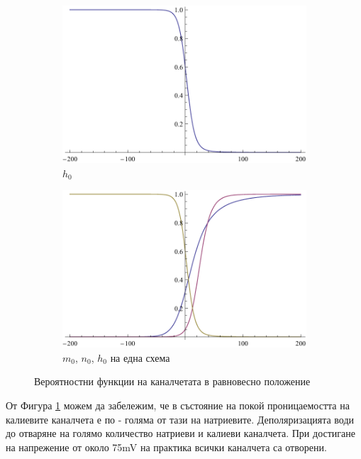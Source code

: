 \documentclass{article}
\numberwithin{equation}{section}
\begin{document}
\begin{figure}[H]
\begin{subfigure}[t]{0.3\textwidth}
            \includegraphics[width=\textwidth]{./schemas/h0.pdf}
            \caption{$h_0$}
        \end{subfigure}
        \begin{subfigure}[t]{0.3\textwidth}
            \includegraphics[width=\textwidth]{./schemas/chanels_combined.pdf}
            \caption{$m_0$, $n_0$, $h_0$ на една схема}
        \end{subfigure}
        \caption{Вероятностни функции на каналчетата в равновесно положение}\label{fig:chanel_prob}
    \end{figure}
    
    От Фигура \ref{fig:chanel_prob} можем да забележим, че в състояние на покой проницаемостта на калиевите каналчета е по - голяма от тази
    на натриевите. Деполяризацията води до отваряне на голямо количество натриеви и калиеви каналчета. При достигане на напрежение от около
    75mV на практика всички каналчета са отворени.
\end{document}
